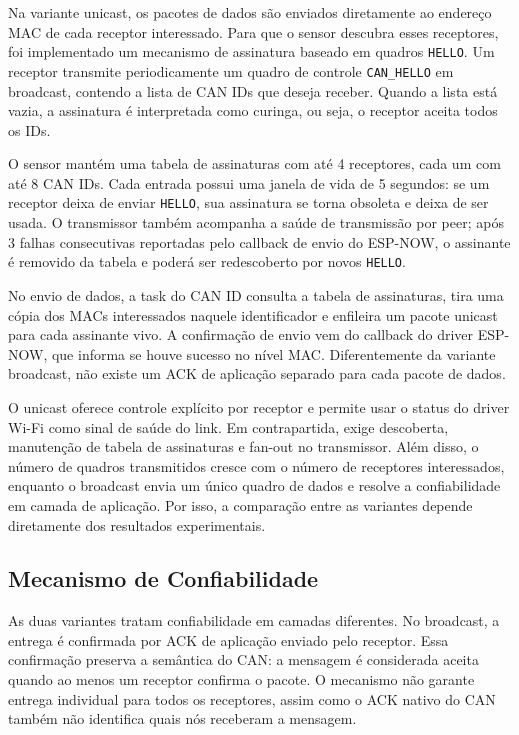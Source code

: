 \documentclass{article}
\begin{document}
    Na variante unicast, os pacotes de dados são enviados diretamente ao endereço MAC de cada receptor interessado. Para que o sensor descubra esses receptores, foi implementado um mecanismo de assinatura baseado em quadros \texttt{HELLO}. Um receptor transmite periodicamente um quadro de controle \texttt{CAN_HELLO} em broadcast, contendo a lista de CAN IDs que deseja receber. Quando a lista está vazia, a assinatura é interpretada como curinga, ou seja, o receptor aceita todos os IDs.

    O sensor mantém uma tabela de assinaturas com até 4 receptores, cada um com até 8 CAN IDs. Cada entrada possui uma janela de vida de 5 segundos: se um receptor deixa de enviar \texttt{HELLO}, sua assinatura se torna obsoleta e deixa de ser usada. O transmissor também acompanha a saúde de transmissão por peer; após 3 falhas consecutivas reportadas pelo callback de envio do ESP-NOW, o assinante é removido da tabela e poderá ser redescoberto por novos \texttt{HELLO}.

    No envio de dados, a task do CAN ID consulta a tabela de assinaturas, tira uma cópia dos MACs interessados naquele identificador e enfileira um pacote unicast para cada assinante vivo. A confirmação de envio vem do callback do driver ESP-NOW, que informa se houve sucesso no nível MAC. Diferentemente da variante broadcast, não existe um ACK de aplicação separado para cada pacote de dados.

    O unicast oferece controle explícito por receptor e permite usar o status do driver Wi-Fi como sinal de saúde do link. Em contrapartida, exige descoberta, manutenção de tabela de assinaturas e fan-out no transmissor. Além disso, o número de quadros transmitidos cresce com o número de receptores interessados, enquanto o broadcast envia um único quadro de dados e resolve a confiabilidade em camada de aplicação. Por isso, a comparação entre as variantes depende diretamente dos resultados experimentais.

    \subsection{Mecanismo de Confiabilidade}

    As duas variantes tratam confiabilidade em camadas diferentes. No broadcast, a entrega é confirmada por ACK de aplicação enviado pelo receptor. Essa confirmação preserva a semântica do CAN: a mensagem é considerada aceita quando ao menos um receptor confirma o pacote. O mecanismo não garante entrega individual para todos os receptores, assim como o ACK nativo do CAN também não identifica quais nós receberam a mensagem.
\end{document}
